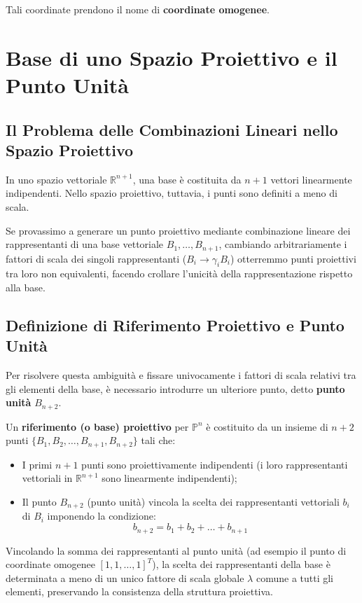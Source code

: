 Tali coordinate prendono il nome di \textbf{coordinate omogenee}.

\section{Base di uno Spazio Proiettivo e il Punto Unità}

\subsection{Il Problema delle Combinazioni Lineari nello Spazio Proiettivo}
In uno spazio vettoriale $\mathbb{R}^{n+1}$, una base è costituita da $n+1$ vettori linearmente indipendenti. Nello spazio proiettivo, tuttavia, i punti sono definiti a meno di scala. 

Se provassimo a generare un punto proiettivo mediante combinazione lineare dei rappresentanti di una base vettoriale $B_1, \dots, B_{n+1}$, cambiando arbitrariamente i fattori di scala dei singoli rappresentanti ($B_i \to \gamma_i B_i$) otterremmo punti proiettivi tra loro non equivalenti, facendo crollare l'unicità della rappresentazione rispetto alla base.

\subsection{Definizione di Riferimento Proiettivo e Punto Unità}
Per risolvere questa ambiguità e fissare univocamente i fattori di scala relativi tra gli elementi della base, è necessario introdurre un ulteriore punto, detto \textbf{punto unità} $B_{n+2}$.

Un \textbf{riferimento (o base) proiettivo} per $\mathbb{P}^n$ è costituito da un insieme di $n+2$ punti $\{B_1, B_2, \dots, B_{n+1}, B_{n+2}\}$ tali che:
\begin{itemize}
    \item I primi $n+1$ punti sono proiettivamente indipendenti (i loro rappresentanti vettoriali in $\mathbb{R}^{n+1}$ sono linearmente indipendenti);
    \item Il punto $B_{n+2}$ (punto unità) vincola la scelta dei rappresentanti vettoriali $b_i$ di $B_i$ imponendo la condizione:
    \begin{equation}
        b_{n+2} = b_1 + b_2 + \dots + b_{n+1}
    \end{equation}
\end{itemize}

Vincolando la somma dei rappresentanti al punto unità (ad esempio il punto di coordinate omogenee $[1, 1, \dots, 1]^T$), la scelta dei rappresentanti della base è determinata a meno di un unico fattore di scala globale $\lambda$ comune a tutti gli elementi, preservando la consistenza della struttura proiettiva.

